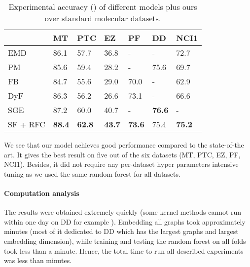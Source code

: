 \documentclass{article}
\begin{document}
\begin{table}
  \begin{center}
  \renewcommand{\arraystretch}{1.2}
    \begin{tabular}[t]{l|M{1.2cm} M{1.2cm} M{1.2cm} M{1.2cm} M{1.2cm} M{1.2cm}}
                    & MT   &     PTC       &      EZ       & PF      & DD      & NCI1 \\
\hline
      EMD           & 86.1 &     57.7      & 36.8          & -       &   -     & 72.7 \\
      PM            & 85.6 &     59.4      & 28.2          & -       &  75.6   & 69.7 \\
      FB            & 84.7 &     55.6      & 29.0          & 70.0    &   -     & 62.9 \\
      DyF           & 86.3 &     56.2      & 26.6          & 73.1    &   -     & 66.6 \\
SGE           & 87.2 & 60.0 & 40.7          & -    &  \textbf{76.6} & -\\
      \hline
SF + RFC      & \textbf{88.4} & \textbf{62.8} & \textbf{43.7} & \textbf{73.6} &  75.4   & \textbf{75.2} \\
      
      \end{tabular}
      \vspace{0.5cm}
      \renewcommand{\arraystretch}{4}
  \end{center}
  \caption{Experimental accuracy () of different models plus ours over standard molecular datasets.}
  \label{tab:results}
\end{table}

We see that our model achieves good performance compared to the state-of-the art. It gives the best result on five out of the six datasets (MT, PTC, EZ, PF, NCI1). Besides, it did not require any per-dataset hyper parameters intensive tuning as we used the same random forest for all datasets.

\paragraph{Computation analysis}

The results were obtained extremely quickly (some kernel methods cannot run within one day on DD for example \citep{dutta2017high}). Embedding all graphs took approximately  minutes
(most of it dedicated to DD which has the largest graphs and largest embedding dimension), while training and testing the random forest on all  folds took less than a minute. Hence, the total time to run all described experiments was less than  minutes.
\end{document}
